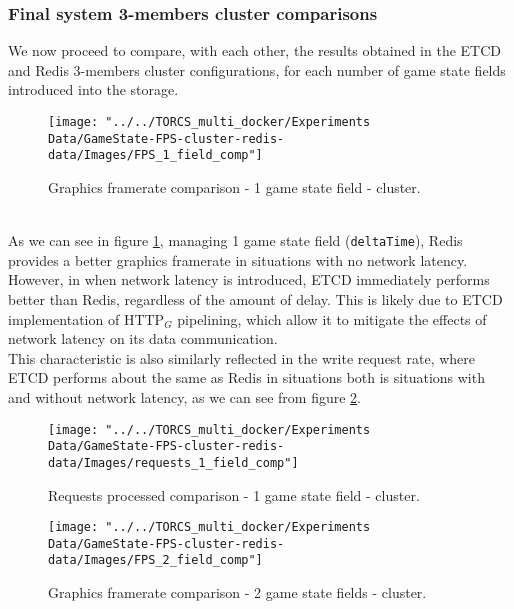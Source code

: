 \subsubsection{Final system 3-members cluster comparisons}
We now proceed to compare, with each other, the results obtained in the ETCD and Redis 3-members cluster configurations, for each number of game state fields introduced into the storage. \\
\begin{figure}[h!]
	\centering
	\texttt{[image: "../../TORCS\_multi\_docker/Experiments Data/GameState-FPS-cluster-redis-data/Images/FPS\_1\_field\_comp"]}
	\caption[Graphics framerate comparison - 1 game state field - cluster]{Graphics framerate comparison - 1 game state field - cluster.}
	\label{fig:fps-1-field-comparison-cluster}
\end{figure}
\\ As we can see in figure \ref{fig:fps-1-field-comparison-cluster}, managing 1 game state field (\texttt{deltaTime}), Redis provides a better graphics framerate in situations with no network latency. However, in when network latency is introduced, ETCD immediately performs better than Redis, regardless of the amount of delay. This is likely due to ETCD implementation of HTTP$_G$ pipelining, which allow it to mitigate the effects of network latency on its data communication. \\
This characteristic is also similarly reflected in the write request rate, where ETCD performs about the same as Redis in situations both is situations with and without network latency, as we can see from figure \ref{fig:requests-1-field-comparison-cluster}. \\
\begin{figure}[h!]
	\centering
	\texttt{[image: "../../TORCS\_multi\_docker/Experiments Data/GameState-FPS-cluster-redis-data/Images/requests\_1\_field\_comp"]}
	\caption[Requests processed comparison - 1 game state field - stand-alone]{Requests processed comparison - 1 game state field - cluster.}
	\label{fig:requests-1-field-comparison-cluster}
\end{figure}
\begin{figure}[h!]
	\centering
	\texttt{[image: "../../TORCS\_multi\_docker/Experiments Data/GameState-FPS-cluster-redis-data/Images/FPS\_2\_field\_comp"]}
	\caption[Graphics framerate comparison - 2 game state fields - cluster]{Graphics framerate comparison - 2 game state fields - cluster.}
	\label{fig:fps-2-field-comparison-cluster}
\end{figure}

